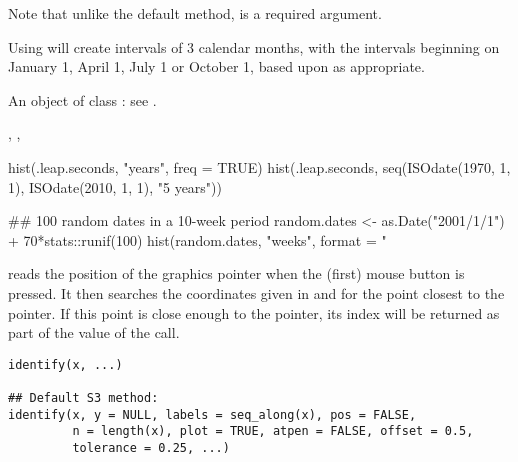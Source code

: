 %
\begin{Details}\relax
Note that unlike the default method,  is a required argument.

Using  will create intervals of 3 calendar
months, with the intervals beginning on January 1, April 1,
July 1 or October 1, based upon  as appropriate.
\end{Details}
%
\begin{Value}
An object of class : see .
\end{Value}
%
\begin{SeeAlso}\relax
{}, , 
\end{SeeAlso}
%
\begin{Examples}
\begin{ExampleCode}
hist(.leap.seconds, "years", freq = TRUE)
hist(.leap.seconds,
     seq(ISOdate(1970, 1, 1), ISOdate(2010, 1, 1), "5 years"))

## 100 random dates in a 10-week period
random.dates <- as.Date("2001/1/1") + 70*stats::runif(100)
hist(random.dates, "weeks", format = "%
\end{ExampleCode}
\end{Examples}
%
\begin{Description}\relax
{} reads the position of the graphics pointer when the
(first) mouse button is pressed.  It then searches the coordinates
given in  and  for the point closest to the pointer.
If this point is close enough to the pointer, its index will be returned as
part of the value of the call.
\end{Description}
%
\begin{Usage}
\begin{verbatim}
identify(x, ...)

## Default S3 method:
identify(x, y = NULL, labels = seq_along(x), pos = FALSE,
         n = length(x), plot = TRUE, atpen = FALSE, offset = 0.5,
         tolerance = 0.25, ...)
\end{verbatim}
\end{Usage}
%
